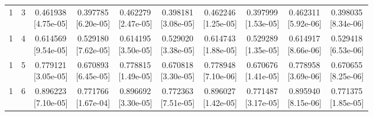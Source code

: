 \documentclass[12pt,letterpaper]{article}
\theoremstyle{plain}
\theoremstyle{definition}
\begin{document}
\begin{table}[p]
\begin{adjustbox}{max width=\linewidth}
\begin{tabular}{@{}rr*{8}{c}@{}}
1 & 3 & \shortstack{0.461938\\[-1pt]{\scriptsize[4.75e-05]}} & \shortstack{0.397785\\[-1pt]{\scriptsize[6.20e-05]}} & \shortstack{0.462279\\[-1pt]{\scriptsize[2.47e-05]}} & \shortstack{0.398181\\[-1pt]{\scriptsize[3.08e-05]}} & \shortstack{0.462246\\[-1pt]{\scriptsize[1.25e-05]}} & \shortstack{0.397999\\[-1pt]{\scriptsize[1.53e-05]}} & \shortstack{0.462311\\[-1pt]{\scriptsize[5.92e-06]}} & \shortstack{0.398035\\[-1pt]{\scriptsize[8.34e-06]}}\\
1 & 4 & \shortstack{0.614569\\[-1pt]{\scriptsize[9.54e-05]}} & \shortstack{0.529180\\[-1pt]{\scriptsize[7.62e-05]}} & \shortstack{0.614195\\[-1pt]{\scriptsize[3.50e-05]}} & \shortstack{0.529020\\[-1pt]{\scriptsize[3.38e-05]}} & \shortstack{0.614743\\[-1pt]{\scriptsize[1.88e-05]}} & \shortstack{0.529289\\[-1pt]{\scriptsize[1.35e-05]}} & \shortstack{0.614917\\[-1pt]{\scriptsize[8.66e-06]}} & \shortstack{0.529418\\[-1pt]{\scriptsize[6.53e-06]}}\\
1 & 5 & \shortstack{0.779121\\[-1pt]{\scriptsize[3.05e-05]}} & \shortstack{0.670893\\[-1pt]{\scriptsize[6.45e-05]}} & \shortstack{0.778815\\[-1pt]{\scriptsize[1.49e-05]}} & \shortstack{0.670818\\[-1pt]{\scriptsize[3.30e-05]}} & \shortstack{0.778948\\[-1pt]{\scriptsize[7.10e-06]}} & \shortstack{0.670676\\[-1pt]{\scriptsize[1.41e-05]}} & \shortstack{0.778958\\[-1pt]{\scriptsize[3.69e-06]}} & \shortstack{0.670655\\[-1pt]{\scriptsize[8.25e-06]}}\\
1 & 6 & \shortstack{0.896223\\[-1pt]{\scriptsize[7.10e-05]}} & \shortstack{0.771766\\[-1pt]{\scriptsize[1.67e-04]}} & \shortstack{0.896692\\[-1pt]{\scriptsize[3.30e-05]}} & \shortstack{0.772363\\[-1pt]{\scriptsize[7.51e-05]}} & \shortstack{0.896027\\[-1pt]{\scriptsize[1.42e-05]}} & \shortstack{0.771487\\[-1pt]{\scriptsize[3.17e-05]}} & \shortstack{0.895940\\[-1pt]{\scriptsize[8.15e-06]}} & \shortstack{0.771375\\[-1pt]{\scriptsize[1.85e-05]}}\\

\end{tabular}
\end{adjustbox}
\end{table}
\end{document}
